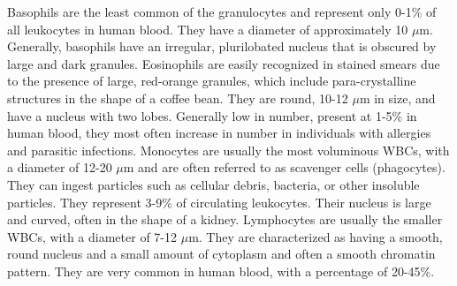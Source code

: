 \documentclass[final,a4paper,12pt,english]{UnicaPhdThesis3}
\begin{document}
Basophils are the least common of the granulocytes and represent only 0-1\% of all leukocytes in human blood. They have a diameter of approximately 10 $\mu$m. Generally, basophils have an irregular, plurilobated nucleus that is obscured by large and dark granules. Eosinophils are easily recognized in stained smears due to the presence of large, red-orange granules, which include para-crystalline structures in the shape of a coffee bean. They are round, 10-12 $\mu$m in size, and have a nucleus with two lobes. Generally low in number, present at 1-5\% in human blood, they most often increase in number in individuals with allergies and parasitic infections. Monocytes are usually the most voluminous WBCs, with a diameter of 12-20 $\mu$m and are often referred to as scavenger cells (phagocytes). They can ingest particles such as cellular debris, bacteria, or other insoluble particles. They represent 3-9\% of circulating leukocytes. Their nucleus is large and curved, often in the shape of a kidney. Lymphocytes are usually the smaller WBCs, with a diameter of 7-12 $\mu$m. They are characterized as having a smooth, round nucleus and a small amount of cytoplasm and often a smooth chromatin pattern. They are very common in human blood, with a percentage of 20-45\%. 
\end{document}

